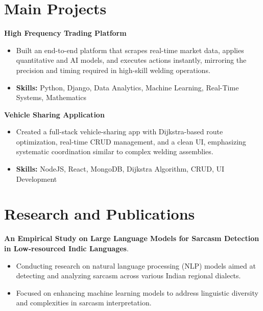 \documentclass[a4paper,11pt]{article}
\begin{document}
\section{\textbf{Main Projects}}

\vspace{1mm}
  \textbf{High Frequency Trading Platform  }
\vspace{-1.5mm} %
\begin{itemize}
  \item Built an end-to-end platform that scrapes real-time market data, applies quantitative and AI models, and executes actions instantly, mirroring the precision and timing required in high-skill welding operations.
\vspace{-3mm}
  \item \textbf{Skills:} Python, Django, Data Analytics, Machine Learning, Real-Time Systems, Mathematics
\end{itemize}


\vspace{1mm}
   \textbf{Vehicle Sharing Application }
\vspace{-1.5mm} %
\begin{itemize}
  \item Created a full-stack vehicle-sharing app with Dijkstra-based route optimization, real-time CRUD management, and a clean UI, emphasizing systematic coordination similar to complex welding assemblies.
\vspace{-3mm}
  \item \textbf{Skills:} NodeJS, React, MongoDB, Dijkstra Algorithm, CRUD, UI Development
\end{itemize}



\section{\textbf{Research and Publications} \hfill }
\vspace{1mm}
  \textbf{An Empirical Study on Large Language Models for Sarcasm Detection in Low-resourced Indic Languages}.
\vspace{-1mm} %
\begin{itemize}
  \item Conducting research on natural language processing (NLP) models aimed at detecting and analyzing sarcasm across various Indian regional dialects.
\vspace{-3mm}
  \item Focused on enhancing machine learning models to address linguistic diversity and complexities in sarcasm interpretation.
\end{itemize}
\end{document}
